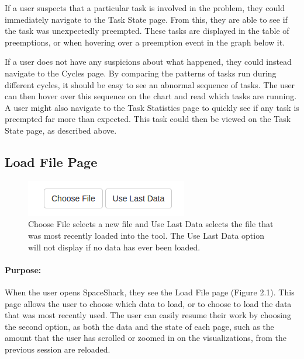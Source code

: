 \documentclass{hmcclinic}
\begin{document}
  If a user suspects that a particular task is involved in the problem, they
  could immediately navigate to the Task State page. From this, they are able to
  see if the task was unexpectedly preempted. These tasks are displayed in the
  table of preemptions, or when hovering over a preemption event in the graph
  below it.

  If a user does not have any suspicions about what happened, they could instead
  navigate to the Cycles page. By comparing the patterns of tasks run during
  different cycles, it should be easy to see an abnormal sequence of tasks. The
  user can then hover over this sequence on the chart and read which tasks are
  running. A user might also navigate to the Task Statistics page to quickly see
  if any task is preempted far more than expected. This task could then be
  viewed on the Task State page, as described above.

%

\subsection{Load File Page}

\begin{figure}[H]
  \centering
      \includegraphics[scale=0.75]{loadFile-buttons.png}
  \caption{Choose File selects a new file and Use Last Data selects the file
  that was most recently loaded into the tool. The Use Last Data option will not
display if no data has ever been loaded.}
  \end{figure}

\paragraph{Purpose:}
When the user opens SpaceShark, they see the Load File page (Figure 2.1).  This
page allows the user to choose which data to load, or to choose to load the data
that was most recently used.  The user can easily resume their work by choosing
the second option, as both the data and the state of each page, such as the amount that the user has scrolled or zoomed in on the visualizations, from the
previous session are reloaded.
\end{document}
